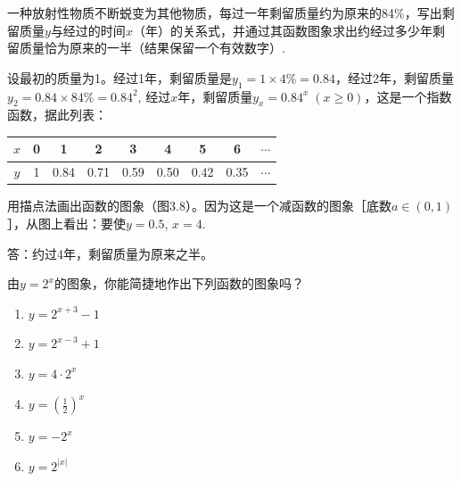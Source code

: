  \begin{example}
     一种放射性物质不断蜕变为其他物质，每过一年剩留质量约为原来的84\%，写出剩留质量$y$与经过的时间$x$（年）的关系式，并通过其函数图象求出约经过多少年剩留质量恰为原来的一半（结果保留一个有效数字）.
 \end{example}
 
 \begin{solution}
    设最初的质量为1。经过1年，剩留质量是$y_1=1\times 4\%=0.84$，经过2年，剩留质量$y_2=0.84\times 84\%=0.84^2$, 经过$x$年，剩留质量$y_x=0.84^x\; (x\ge 0)$，这是一个指数函数，据此列表：
 \begin{center}
     \begin{tabular}{ccccccccc}
 \hline
 $x$&0&1&2&3&4&5&6&$\cdots$\\
 \hline
 $y$&1&0.84&0.71&0.59&0.50&0.42&0.35&$\cdots$ \\
 \hline
     \end{tabular}
 \end{center}
 用描点法画出函数的图象（图3.8）。因为这是一个减函数的图象［底数$a\in(0,1)$］，从图上看出：要使$y=0.5$, $x=4$.
 \begin{figure}[htp]
     \centering
     \caption{}
 \end{figure}
 
 答：约过4年，剩留质量为原来之半。
 \end{solution}
 
 \begin{ex}
 由$y=2^x$的图象，你能简捷地作出下列函数的图象吗？
 \begin{multicols}{2}
 \begin{enumerate}[(1)]
     \item $y=2^{x+3}-1$
     \item $y=2^{x-3}+1$
     \item $y=4\cdot 2^x$
     \item $y=\left(\frac{1}{2}\right)^x$
     \item $y=-2^{x}$
     \item $y=2^{|x|}$
 \end{enumerate}
 \end{multicols}
 \end{ex}
 
